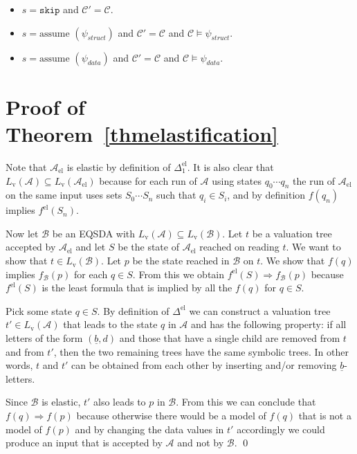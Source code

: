 \documentclass{llncs}
\newcommand{\A}{\mathcal{A}}
\newcommand{\B}{\mathcal{B}}
\newcommand{\AEL}{\A_\text{el}}
\newcommand{\blank}{\underline{b}}
\newcommand{\Lval}{L_{\text{v}}}
\begin{document}
\begin{definition}
\begin{itemize}
\item $s = \texttt{skip}$ and $\mathcal{C'} = \mathcal{C}$.



\item $s = \text{assume } (\psi_{struct}) $ and $\mathcal{C'} = \mathcal{C}$ and $\mathcal{C} \models \psi_{struct}$.

\item $s = \text{assume } (\psi_{data})$ and $\mathcal{C'} = \mathcal{C}$ and $\mathcal{C} \models \psi_{data}$.

\end{itemize}

\end{definition}



\section{Proof of Theorem~\ref{thmelastification}}\label{app-elastification}

Note that $\AEL$ is elastic by definition of $\Delta_1^{\text{el}}$. It
is also clear that $\Lval(\A) \subseteq \Lval(\AEL)$ because for each
run of $\A$ using states $q_0 \cdots q_n$ the run of $\AEL$ on the
same input uses sets $S_0 \cdots S_n$ such that $q_i \in S_i$, and by
definition $f(q_n)$ implies $f^{\text{el}}(S_n)$.

Now let $\B$ be an EQSDA with $\Lval(\A) \subseteq \Lval(\B)$. Let $t$ be a valuation tree 
accepted by $\AEL$ and let $S$ be the
state of $\AEL$ reached on reading $t$.  We want to show that $t \in
\Lval(\B)$.  Let $p$ be the state reached in $\B$ on $t$. We show that
$f(q)$ implies $f_\B(p)$ for each $q \in S$. From this we obtain
$f^{\text{el}}(S) \Rightarrow f_\B(p)$ because $f^{\text{el}}(S)$ is
the least formula that is implied by all the $f(q)$ for $q \in S$.




Pick some state $q \in S$. By definition of $\Delta^{\text{el}}$ we
can construct a valuation tree $t' \in \Lval(\A)$ that leads to the state $q$ in
$\A$ and has the following property: if all letters of the form
$(\blank,d)$ and those that have a single child are removed from $t$ and from $t'$, then the two
remaining trees have the same symbolic trees. In other words, $t$ and $t'$ can be
obtained from each other by inserting and/or removing
$\blank$-letters.

Since $\B$ is elastic, $t'$ also leads to $p$ in $\B$. From this we
can conclude that $f(q) \Rightarrow f(p)$ because otherwise there
would be a model of $f(q)$ that is not a model of $f(p)$ and by
changing the data values in $t'$ accordingly we could produce an input
that is accepted by $\A$ and not by $\B$.
\qed
\end{document}
